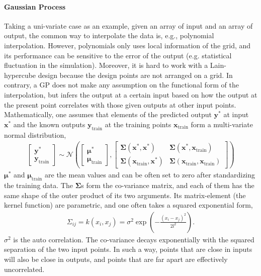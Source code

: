 \paragraph{Gaussian Process} Taking a uni-variate case as an example, given an array of input and an array of output, the common way to interpolate the data is, e.g., polynomial interpolation.
However, polynomials only uses local information of the grid, and its performance can be sensitive to the error of the output (e.g. statistical fluctuation in the simulation).
Moreover, it is hard to work with a Lain-hypercube design because the design points are not arranged on a grid.
In contrary, a GP does not make any assumption on the functional form of the interpolation, but infers the output at a certain input based on how the output at the present point correlates with those given outputs at other input points.
Mathematically, one assumes that elements of the predicted output $\mathbf{y}^*$ at input $\mathbf{x^*}$ and the known outputs $\mathbf{y}_{\textrm{train}}$ at the training points $\mathbf{x}_{\textrm{train}}$ form a multi-variate normal distribution,
\begin{eqnarray}
\begin{bmatrix}
\mathbf{y}^* \\
\mathbf{y}_{\textrm{train}}
\end{bmatrix}
\sim
\mathcal{N}\left(
\begin{bmatrix}
\mathbf{\mu}^* \\
\mathbf{\mu}_{\textrm{train}}
\end{bmatrix},
\begin{bmatrix}
\mathbf{\Sigma}(\mathbf{x}^*, \mathbf{x}^*)& \mathbf{\Sigma}(\mathbf{x}^*, \mathbf{x}_{\textrm{train}}) \\
\mathbf{\Sigma}(\mathbf{x}_{\textrm{train}}, \mathbf{x}^*)& \mathbf{\Sigma}(\mathbf{x}_{\textrm{train}}, \mathbf{x}_{\textrm{train}})
\end{bmatrix}
\right)
\end{eqnarray}
$\mathbf{\mu}^*$ and $\mathbf{\mu}_{\textrm{train}}$ are the mean values and can be often set to zero after standardizing the training data.
The $\mathbf{\Sigma}$s form the co-variance matrix, and each of them has the same shape of the outer product of its two arguments.
Its matrix-element (the kernel function) are parametric, and one often takes a squared exponential form,
\begin{eqnarray}
\Sigma_{ij} = k(x_i, x_j) = \sigma^2 \exp\left(-\frac{(x_i-x_j)^2}{2l^2}\right).
\end{eqnarray}
$\sigma^2$ is the auto correlation. 
The co-variance decays exponentially with the squared separation of the two input points.
In such a way, points that are close in inputs will also be close in outputs, and points that are far apart are effectively uncorrelated.


